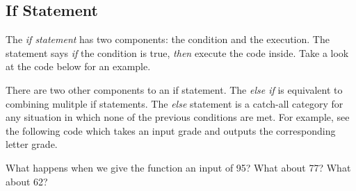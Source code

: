 \documentclass[paper=a4, fontsize=11pt]{scrartcl} %
\numberwithin{equation}{section} %
\numberwithin{figure}{section} %
\numberwithin{table}{section} %
\begin{document}
\subsection{If Statement}
The \textit{if statement} has two components: the condition and the execution.
The statement says \textit{if} the condition is true, \textit{then} execute the code inside. Take a look at the code below for an example. 


There are two other components to an if statement. 
The \textit{else if} is equivalent to combining mulitple if statements. 
The \textit{else} statement is a catch-all category for any situation in which none of the previous conditions are met.
For example, see the following code which takes an input grade and outputs the corresponding letter grade.

What happens when we give the function an input of 95? What about 77? What about 62?
\end{document}
